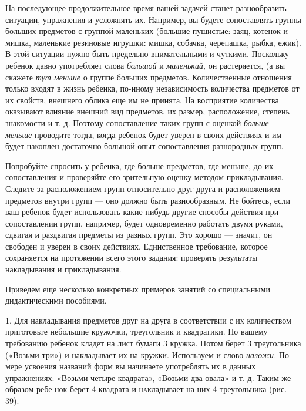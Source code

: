 \documentclass[a5paper]{book}
\renewcommand{\emph}[1]{\textit{#1}}
\begin{document}
На последующее продолжительное время вашей задачей станет разнообразить
ситуации, упражнения и усложнять их. Например, вы будете сопоставлять
группы больших предметов с группой маленьких (большие пушистые: заяц,
котенок и мишка, маленькие резиновые игрушки: мишка, собачка, черепашка,
рыбка, ежик). В этой ситуации нужно быть предельно внимательными и
чуткими. Поскольку ребенок давно употребляет слова \emph{большой} и
\emph{маленький,} он растеряется, (а вы скажете \emph{тут меньше} о
группе больших предметов. Количественные отношения только входят в жизнь
ребенка, по-иному независимость количества предметов от их свойств,
внешнего облика еще им не принята. На восприятие количества оказывают
влияние внешний вид предметов, их размер, расположение, степень
знакомости и т. д. Поэтому сопоставление таких групп с оценкой
\emph{больше} --- \emph{меньше} проводите тогда, когда ребенок будет
уверен в своих действиях и им будет накоплен достаточно большой опыт
сопоставления разнородных групп.

Попробуйте спросить у ребенка, где больше предметов, где меньше, до их
сопоставления и проверяйте его зрительную оценку методом прикладывания.
Следите за расположением групп относительно друг друга и расположением
предметов внутри групп --- оно должно быть разнообразным. Не бойтесь,
если ваш ребенок будет использовать какие-нибудь другие способы действия
при сопоставлении групп, например, будет одновременно работать двумя
руками, сдвигая и раздвигая предметы из разных групп. Это хорошо ---
значит, он свободен и уверен в своих действиях. Единственное требование,
которое сохраняется на протяжении всего этого задания: проверять
результаты накладывания и прикладывания.

Приведем еще несколько конкретных примеров занятий со специальными
дидактическими пособиями.

1. Для накладывания предметов друг на друга в соответствии с их
количеством приготовьте небольшие кружочки, треугольник и квадратики. По
вашему требованию ребенок кладет на лист бумаги 3 кружка. Потом берет 3
треугольника («Возьми три») и накладывает их на кружки. Используем и
слово \emph{наложи.} По мере усвоения названий форм вы начинаете
употреблять их в данных упражнениях: «Возьми четыре квадрата», «Возьми
два овала» и т. д. Таким же образом ребе нок берет 4 квадрата и
\textsc{на}кладывает на них 4 треугольника (рис. 39).
\end{document}
